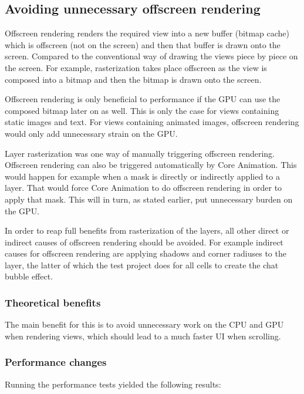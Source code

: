 \documentclass[a4paper,12pt]{article}
\begin{document}
\subsection{Avoiding unnecessary offscreen rendering}
Offscreen rendering renders the required view into a new buffer (bitmap cache) which is offscreen (not on the screen) and then that buffer is drawn onto the screen. Compared to the conventional way of drawing the views piece by piece on the screen. For example, rasterization takes place offscreen as the view is composed into a bitmap and then the bitmap is drawn onto the screen.

Offscreen rendering is only beneficial to performance if the GPU can use the composed bitmap later on as well. This is only the case for  views containing static images and text. For views containing animated images, offscreen rendering would only add unnecessary strain on the GPU.

Layer rasterization was one way of manually triggering offscreen rendering. Offscreen rendering can also be triggered automatically by Core Animation. This would happen for example when a mask is directly or indirectly applied to a layer. That would force Core Animation to do offscreen rendering in order to apply that mask. This will in turn, as stated earlier, put unnecessary burden on the GPU.\cite{MovingPixelsOntoTheScreen}

In order to reap full benefits from rasterization of the layers, all other direct or indirect causes of offscreen rendering should be avoided. For example indirect causes for offscreen rendering are applying shadows and corner radiuses to the layer, the latter of which the test project does for all cells to create the chat bubble effect.\cite{MovingPixelsOntoTheScreen}

\subsubsection*{Theoretical benefits}
The main benefit for this is to avoid unnecessary work on the CPU and GPU when rendering views, which should lead to a much faster UI when scrolling. 

\subsubsection*{Performance changes}
Running the performance tests yielded the following results:
\end{document}
